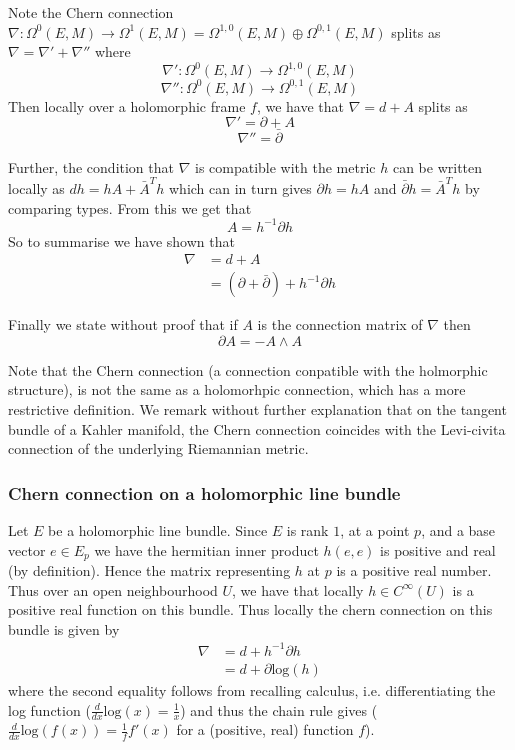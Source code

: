 \documentclass[a4paper]{article}
\theoremstyle{definition} \newtheorem*{definition}{Definition}
\theoremstyle{definition} \newtheorem*{definitions}{Definitions}
\theoremstyle{plain} \newtheorem{theorem}{Theorem}[section]
\theoremstyle{plain} \newtheorem{proposition}[theorem]{Proposition}
\theoremstyle{plain} \newtheorem{corollary}[theorem]{Corollary}
\theoremstyle{plain} \newtheorem{lemma}[theorem]{Lemma}
\theoremstyle{plain} \newtheorem{example}[theorem]{Example}
\newcommand{\smooth}{C^\infty}
\begin{document}
Note the Chern connection $\nabla:\Omega^0(E, M)\to \Omega^1(E, M)=\Omega^{1,0}(E, M) \oplus \Omega^{0,1}(E, M)$ splits as
$\nabla = \nabla' + \nabla''$ where
$$\nabla ': \Omega^0(E, M)\to \Omega^{1,0}(E, M)$$
$$\nabla '': \Omega^0(E, M)\to \Omega^{0,1}(E, M)$$
Then locally over a holomorphic frame $f$, we have that $\nabla=d+A$ splits as  
$$\nabla ' = \partial + A$$
$$\nabla '' = \bar{\partial}$$

Further, the condition that $\nabla$ is compatible with the metric $h$ can be written locally as $dh = hA + \bar{A}^Th$
which can in turn gives 
$\partial h = h A$ and
$\bar{\partial} h = \bar{A}^T h$ by comparing types. From this we get that
$$A= h^{-1}\partial h$$
So to summarise we have shown that 
\begin{align*}
    \nabla & = d + A \\
    & = (\partial + \bar{\partial}) + h^{-1}\partial h
\end{align*}

Finally we state without proof that if $A$ is the connection matrix of $\nabla$ then
$$\partial A= -A \wedge A$$

Note that the Chern connection (a connection conpatible with the holmorphic structure), is not the same as a holomorhpic connection, which has a more restrictive definition. We remark without further explanation that on the tangent bundle of a Kahler manifold, the Chern connection coincides with the Levi-civita connection of the underlying Riemannian metric.  

\subsubsection{Chern connection on a holomorphic line bundle}
Let $E$ be a holomorphic line bundle. 
Since $E$ is rank $1$, at a point $p$, and a base vector $e \in E_p$ we have the hermitian inner product $h(e, e)$ is positive and real (by definition). Hence the matrix representing $h$ at $p$ is a positive real number. Thus over an open neighbourhood $U$, we have that locally $h\in \smooth(U)$ is a positive real function on this bundle. Thus locally the chern connection on this bundle is given by 
\begin{align*}
\nabla & = d + h^{-1}\partial h \\
& = d + \partial \text{log} (h)
\end{align*}
where the second equality follows from recalling calculus, i.e. differentiating the log function ($\frac{d}{dx} \text{log}(x) = \frac{1}{x}$) and thus the chain rule gives ($\frac{d}{dx} \text{log}(f(x)) = \frac{1}{f} f'(x)$ for a (positive, real) function $f$). 
\end{document}
